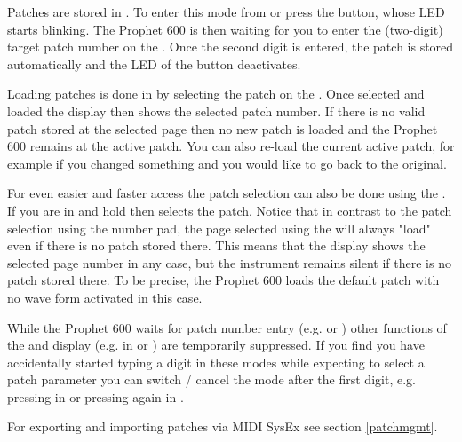 Patches are stored in \storagemode. To enter this mode from \presetmode or \livemode press the \record button, whose LED starts blinking. The Prophet 600 is then waiting for you to enter the (two-digit) target patch number on the \termnumberpad. Once the second digit is entered, the patch is stored automatically and the LED of the \record button deactivates. 

Loading patches is done in \presetpatch by selecting the patch on the \termnumberpad. Once selected and loaded the display then shows the selected patch number. If there is no valid patch stored at the selected page then no new patch is loaded and the Prophet 600 remains at the active patch. You can also re-load the current active patch, for example if you changed something and you would like to go back to the original. 

For even easier and faster access the patch selection can also be done using the \datadial. If you are in \presetmode and hold \fromtape then \datadial selects the patch. Notice that in contrast to the patch selection using the number pad, the page selected using the \datadial will always "load" even if there is no patch stored there. This means that the display shows the selected page number in any case, but the instrument remains silent if there is no patch stored there. To be precise, the Prophet 600 loads the default patch with no wave form activated in this case. 

While the Prophet 600 waits for patch number entry (e.g. \storagemode or \presetpatch) other functions of the \termnumberpad and display (e.g. in \presetpanel or \livemode) are temporarily suppressed. If you find you have accidentally started typing a digit in these modes while expecting to select a patch parameter you can switch / cancel the mode after the first digit, e.g. pressing \totape in \presetpatch or pressing \record again in \storagemode.

For exporting and importing patches via MIDI SysEx see section \ref{patchmgmt}.
